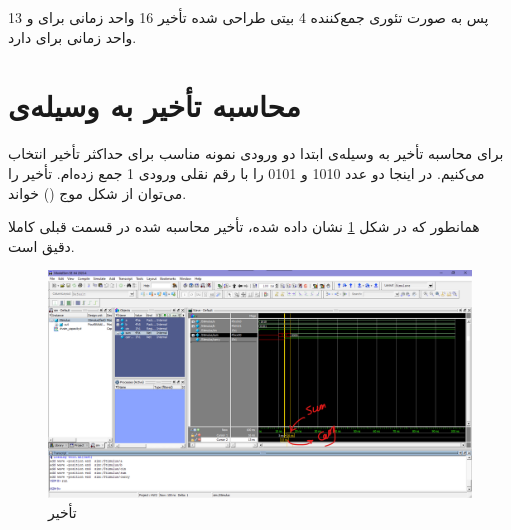 \documentclass{article}
\begin{document}
پس به صورت تئوری جمع‌کننده 4 بیتی طراحی شده تأخیر 16 واحد زمانی برای 
و 13 واحد زمانی برای 
دارد.

\section*{محاسبه تأخیر به وسیله‌ی }
برای محاسبه تأخیر به وسیله‌ی 
ابتدا دو ورودی نمونه مناسب برای حداکثر تأخیر انتخاب می‌کنیم. در اینجا دو عدد 
1010
و
0101
را با رقم نقلی ورودی 1 جمع زده‌ام. تأخیر را می‌توان از شکل موج 
()
خواند.

همانطور که در شکل
\ref{ModelSim}
نشان داده شده، تأخیر محاسبه شده در قسمت قبلی کاملا دقیق است.

\begin{figure}[!htbp]
    \centering
    \includegraphics[width=\linewidth]{ModelSim.png}
    \caption{تأخیر }
    \label{ModelSim}
\end{figure}
\end{document}
